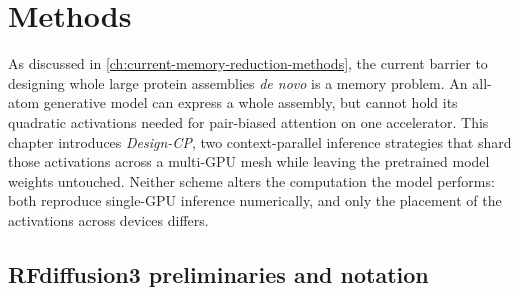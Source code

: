 \chapter{Methods}
\label{ch:methods}


As discussed in \cref{ch:current-memory-reduction-methods}, the current barrier to designing
whole large protein assemblies \emph{de novo} is a memory problem. An all-atom
generative model can express a whole assembly, but cannot hold its quadratic
activations needed for pair-biased attention on one accelerator. This chapter introduces \emph{Design-CP}, two
context-parallel inference strategies that shard those activations across a
multi-GPU mesh while leaving the pretrained model weights untouched. Neither
scheme alters the computation the model performs: both reproduce single-GPU
inference numerically, and only the placement of the activations across devices
differs.

\section{RFdiffusion3 preliminaries and notation}
\label{sec:rfd3-prelim}

